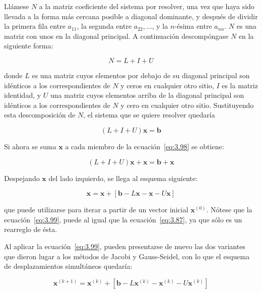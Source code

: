 \documentclass[12pt,letterpaper]{article}
\theoremstyle{definition}
\theoremstyle{plain}
\theoremstyle{remark}
\begin{document}
Llámese $N$ a la matriz coeficiente del sistema por resolver, una vez que haya sido llevada a la forma más cercana posible a diagonal dominante, y después de dividir la primera fila entre $a_{11}$, la segunda entre $a_{22}, \ldots$, y la $n$-ésima entre $a_{nn}$. $N$ es una matriz con unos en la diagonal principal. A continuación descompóngase $N$ en la siguiente forma:

\begin{equation}
N = L + I + U
\end{equation}

donde $L$ es una matriz cuyos elementos por debajo de su diagonal principal son idénticos a los correspondientes de $N$ y ceros en cualquier otro sitio, $I$ es la matriz identidad, y $U$ una matriz cuyos elementos arriba de la diagonal principal son idénticos a los correspondientes de $N$ y cero en cualquier otro sitio. Sustituyendo esta descomposición de $N$, el sistema que se quiere resolver quedaría

\begin{equation}
(L + I + U)\mathbf{x} = \mathbf{b}
\label{eq:3.98}
\tag{18}
\end{equation}

Si ahora se suma $\mathbf{x}$ a cada miembro de la ecuación~\eqref{eq:3.98} se obtiene:

\[
(L + I + U)\mathbf{x} + \mathbf{x} = \mathbf{b} + \mathbf{x}
\]

Despejando $\mathbf{x}$ del lado izquierdo, se llega al esquema siguiente:

\begin{equation}
\mathbf{x} = \mathbf{x} + \left[\mathbf{b} - L \mathbf{x} - \mathbf{x} - U \mathbf{x} \right]
\label{eq:3.99}
\tag{19}
\end{equation}

que puede utilizarse para iterar a partir de un vector inicial $\mathbf{x}^{(0)}$. Nótese que la ecuación~\eqref{eq:3.99}, puede al igual que la ecuación~\eqref{eq:3.87}, ya que sólo es un rearreglo de ésta.

Al aplicar la ecuación~\eqref{eq:3.99}, pueden presentarse de nuevo las dos variantes que dieron lugar a los métodos de Jacobi y Gauss-Seidel, con lo que el esquema de desplazamientos simultáneos quedaría:

\begin{equation}
\mathbf{x}^{(k+1)} = \mathbf{x}^{(k)} + \left[\mathbf{b} - L \mathbf{x}^{(k)} - \mathbf{x}^{(k)} - U \mathbf{x}^{(k)} \right]
\label{eq:3.100}
\tag{20}
\end{equation}
\end{document}
